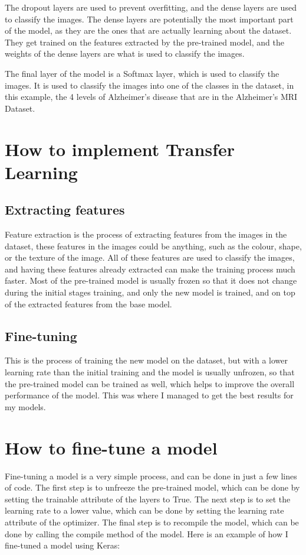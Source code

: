 \documentclass[]{final_report}
\begin{document}
The dropout layers are used to prevent overfitting, and the dense layers are used to classify the images.
The dense layers are potentially the most important part of the model, as they are the ones that are actually learning about the dataset.
They get trained on the features extracted by the pre-trained model, and the weights of the dense layers are what is used to classify the images.

The final layer of the model is a Softmax layer, which is used to classify the images.
It is used to classify the images into one of the classes in the dataset, in this example,
the 4 levels of Alzheimer's disease that are in the Alzheimer's MRI Dataset.

\pagebreak
\section{How to implement Transfer Learning}

\subsection{Extracting features}
Feature extraction is the process of extracting features from the images in the dataset, these features
in the images could be anything, such as the colour, shape, or the texture of the image. All of these features
are used to classify the images, and having these features already extracted can make the training process much faster.
Most of the pre-trained model is usually frozen so that it does not change during the initial stages training, and only the new model is trained,
and on top of the extracted features from the base model.

\subsection{Fine-tuning}
This is the process of training the new model on the dataset, but with a lower learning rate than the initial training and the model is usually unfrozen,
so that the pre-trained model can be trained as well, which helps to improve the overall performance of the model.
This was where I managed to get the best results for my models.

\section{How to fine-tune a model}
Fine-tuning a model is a very simple process, and can be done in just a few lines of code.
The first step is to unfreeze the pre-trained model, which can be done by setting the trainable attribute of the layers to True.
The next step is to set the learning rate to a lower value, which can be done by setting the learning rate attribute of the optimizer.
The final step is to recompile the model, which can be done by calling the compile method of the model.
Here is an example of how I fine-tuned a model using Keras:
\end{document}
